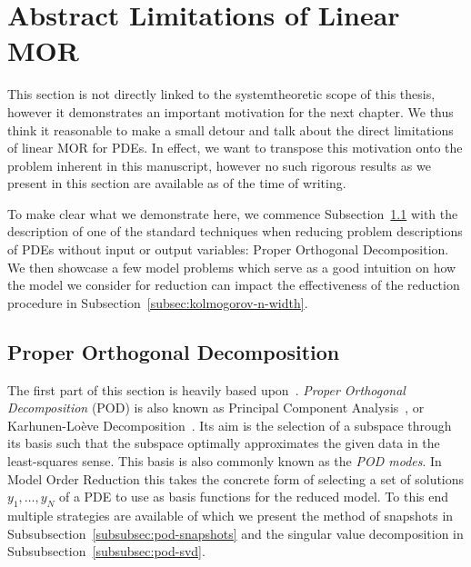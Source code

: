 \section{Abstract Limitations of Linear MOR}\label{sec:limitations-linear-mor}

This section is not directly linked to the systemtheoretic scope of this thesis, however it demonstrates an important motivation for the next chapter.
We thus think it reasonable to make a small detour and talk about the direct limitations of linear MOR for PDEs.
In effect, we want to transpose this motivation onto the problem inherent in this manuscript, however no such rigorous results as we present in this section are available as of the time of writing.

To make clear what we demonstrate here, we commence Subsection~\ref{subsec:pod} with the description of one of the standard techniques when reducing problem descriptions of PDEs without input or output variables: Proper Orthogonal Decomposition.
We then showcase a few model problems which serve as a good intuition on how the model we consider for reduction can impact the effectiveness of the reduction procedure in Subsection~\ref{subsec:kolmogorov-n-width}.


\subsection{Proper Orthogonal Decomposition}\label{subsec:pod}


The first part of this section is heavily based upon~\cite{Pinnau2008}.
\emph{Proper Orthogonal Decomposition} (POD) is also known as Principal Component Analysis~\cite{Hotelling1936}, or Karhunen-Loève Decomposition~\cite{Karhunen1946}.
Its aim is the selection of a subspace through its basis such that the subspace optimally approximates the given data in the least-squares sense.
This basis is also commonly known as the \emph{POD modes}.
In Model Order Reduction this takes the concrete form of selecting a set of solutions $y_1, \dots, y_N$ of a PDE to use as basis functions for the reduced model.
To this end multiple strategies are available of which we present the method of snapshots in Subsubsection~\ref{subsubsec:pod-snapshots} and the singular value decomposition in Subsubsection~\ref{subsubsec:pod-svd}.

